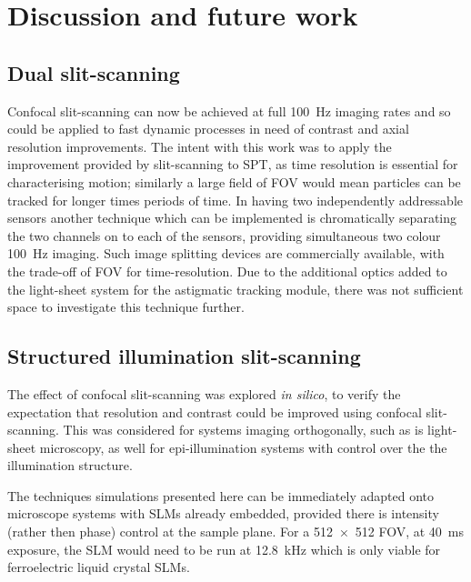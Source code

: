\section{Discussion and future work}

\subsection{Dual \gls{slit-scanning}}

Confocal \gls{slit-scanning} can now be achieved at full \SI{100}{\hertz} imaging rates and so could be applied to fast dynamic processes in need of contrast and axial resolution improvements.
The intent with this work was to apply the improvement provided by \gls{slit-scanning} to \gls{SPT}, as time resolution is essential for characterising motion; similarly a large field of \gls{FOV} would mean particles can be tracked for longer times periods of time.
In having two independently addressable sensors another technique which can be implemented is chromatically separating the two channels on to each of the sensors, providing simultaneous two colour \SI{100}{\hertz} imaging.
Such image splitting devices are commercially available\cite{EmissionImageSplitter}, with the trade-off of \gls{FOV} for time-resolution.
Due to the additional optics added to the light-sheet system for the astigmatic tracking module, there was not sufficient space to investigate this technique further.

\subsection{Structured illumination \gls{slit-scanning}}

The effect of confocal \gls{slit-scanning} was explored \emph{in silico}, to verify the expectation that resolution and contrast could be improved using confocal \gls{slit-scanning}.
This was considered for systems imaging orthogonally, such as is light-sheet microscopy, as well for epi-illumination systems with control over the the illumination structure.

The techniques simulations presented here can be immediately adapted onto microscope systems with \gls{SLM}s already embedded, provided there is intensity (rather then phase) control at the sample plane.
For a \SI{512x512}{} \gls{FOV}, at \SI{40}{\milli\second} exposure, the \gls{SLM} would need to be run at \SI{12.8}{\kilo\hertz} which is only viable for ferroelectric liquid crystal SLMs.

